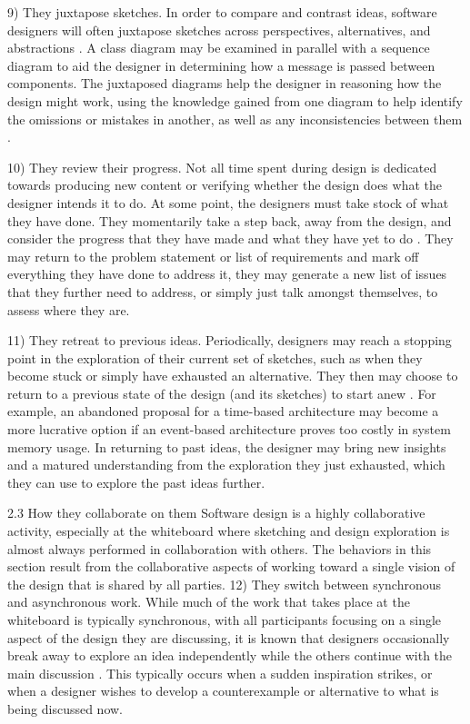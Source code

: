 9)	They juxtapose sketches. In order to compare and contrast ideas, software designers will often juxtapose sketches across perspectives, alternatives, and abstractions \cite{petre2009insights}. A class diagram may be examined in parallel with a sequence diagram to aid the designer in determining how a message is passed between components. The juxtaposed diagrams help the designer in reasoning how the design might work, using the knowledge gained from one diagram to help identify the omissions or mistakes in another, as well as any inconsistencies between them \cite{petre2009insights}. 

10)	They review their progress. Not all time spent during design is dedicated towards producing new content or verifying whether the design does what the designer intends it to do. At some point, the designers must take stock of what they have done. They momentarily take a step back, away from the design, and consider the progress that they have made and what they have yet to do \cite{mangano2012design}. They may return to the problem statement or list of requirements and mark off everything they have done to address it, they may generate a new list of issues that they further need to address, or simply just talk amongst themselves, to assess where they are.
 
11)	They retreat to previous ideas. Periodically, designers may reach a stopping point in the exploration of their current set of sketches, such as when they become stuck or simply have exhausted an alternative. They then may choose to return to a previous state of the design (and its sketches) to start anew \cite{zannier2007model}. For example, an abandoned proposal for a time-based architecture may become a more lucrative option if an event-based architecture proves too costly in system memory usage. In returning to past ideas, the designer may bring new insights and a matured understanding from the exploration they just exhausted, which they can use to explore the past ideas further.

2.3	How they collaborate on them
Software design is a highly collaborative activity, especially at the whiteboard where sketching and design exploration is almost always performed in collaboration with others. The behaviors in this section result from the collaborative aspects of working toward a single vision of the design that is shared by all parties.
12)	They switch between synchronous and asynchronous work. While much of the work that takes place at the whiteboard is typically synchronous, with all participants focusing on a single aspect of the design they are discussing, it is known that designers occasionally break away to explore an idea independently while the others continue with the main discussion \cite{dekel2005supporting}. This typically occurs when a sudden inspiration strikes, or when a designer wishes to develop a counterexample or alternative to what is being discussed now.


